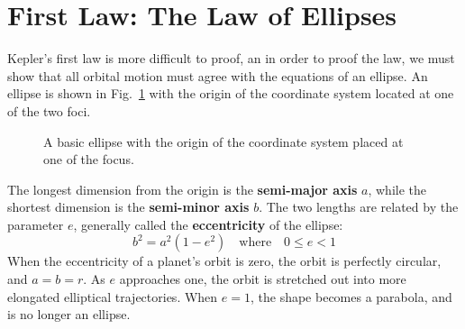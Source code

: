 \documentclass[11pt]{article}
\begin{document}
\section{First Law: The Law of Ellipses}
Kepler's first law is more difficult to proof, an in order to proof the
law, we must show that all orbital motion must agree with the equations of an
ellipse. An ellipse is shown in Fig.~\ref{ellipse1} with the origin of the
coordinate system located at one of the two foci.
\begin{figure}[!ht]
  \centering
  \caption{A basic ellipse with the origin of the coordinate system placed at
    one of the focus.}
  \label{ellipse1}
\end{figure}

The longest dimension from the origin is the \textbf{semi-major axis} $a$, while
the shortest dimension is the \textbf{semi-minor axis} $b$. The two lengths are
related by the parameter $e$, generally called the \textbf{eccentricity} of the
ellipse:
\begin{equation}
  b^2=a^2(1-e^2)\quad\text{where}\quad 0\leq e < 1
\end{equation}
When the eccentricity of a planet's orbit is zero, the orbit is perfectly
circular, and $a=b=r$. As $e$ approaches one, the orbit is stretched out into
more elongated elliptical trajectories.
When $e=1$, the shape becomes a parabola, and is no longer an ellipse.
\end{document}
